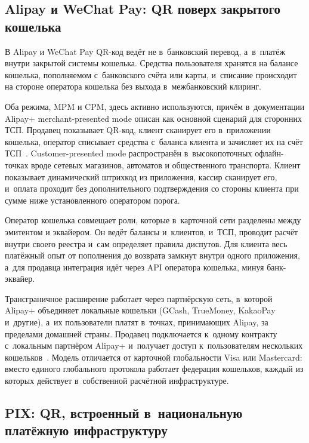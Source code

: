 \subsection*{Alipay и WeChat Pay: QR поверх закрытого
кошелька}\label{sec:qr-wallet-closed-loop}

В Alipay и WeChat Pay QR-код ведёт не в~банковский перевод,
а~в~платёж внутри закрытой системы кошелька. Средства пользователя
хранятся на балансе кошелька, пополняемом с~банковского счёта или
карты, и~списание происходит на стороне оператора кошелька без
выхода в~межбанковский клиринг.

Оба режима, MPM и CPM, здесь активно используются, причём
в~документации Alipay+ merchant-presented mode описан как основной
сценарий для сторонних ТСП. Продавец показывает QR-код,
клиент сканирует его в~приложении кошелька, оператор списывает
средства с~баланса клиента и зачисляет их на счёт
ТСП~\cite{alipayplus-mpm}. Customer-presented mode распространён
в~высокопоточных офлайн-точках вроде сетевых магазинов, автоматов
и общественного транспорта. Клиент показывает динамический штрихкод
из приложения, кассир сканирует его, и~оплата проходит без
дополнительного подтверждения со стороны клиента при сумме ниже
установленного оператором порога.

Оператор кошелька совмещает роли, которые в~карточной сети
разделены между эмитентом и эквайером. Он ведёт балансы и~клиентов,
и~ТСП, проводит расчёт внутри своего реестра и~сам определяет
правила диспутов. Для клиента весь платёжный опыт от пополнения
до возврата замкнут внутри одного приложения, а~для продавца
интеграция идёт через API оператора кошелька, минуя банк-эквайер.

Трансграничное расширение работает через партнёрскую сеть, в~которой
Alipay+ объединяет локальные кошельки (GCash, TrueMoney, KakaoPay
и~другие), а~их пользователи платят в~точках, принимающих Alipay, за
пределами домашней страны. Продавец подключается к~одному контракту
с~локальным партнёром Alipay+ и~получает доступ к~пользователям
нескольких кошельков~\cite{alipayplus-mpm}. Модель отличается
от карточной глобальности Visa или Mastercard: вместо единого
глобального протокола работает федерация кошельков, каждый из которых
действует в~собственной расчётной инфраструктуре.

\subsection*{PIX: QR, встроенный в~национальную платёжную
инфраструктуру}\label{sec:qr-pix}


